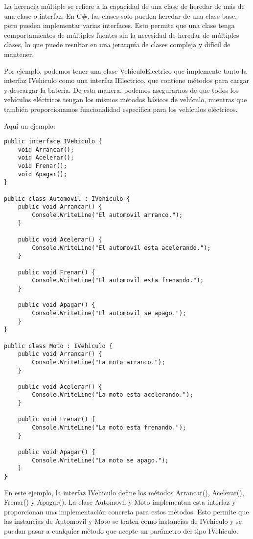 \documentclass[executivepaper]{article}
\begin{document}
La herencia múltiple se refiere a la capacidad de una clase de heredar de más de una clase o interfaz. En C\#, las clases solo pueden heredar de una clase base, pero pueden implementar varias interfaces. Esto permite que una clase tenga comportamientos de múltiples fuentes sin la necesidad de heredar de múltiples clases, lo que puede resultar en una jerarquía de clases compleja y difícil de mantener.

Por ejemplo, podemos tener una clase VehiculoElectrico que implemente tanto la interfaz IVehiculo como una interfaz IElectrico, que contiene métodos para cargar y descargar la batería. De esta manera, podemos asegurarnos de que todos los vehículos eléctricos tengan los mismos métodos básicos de vehículo, mientras que también proporcionamos funcionalidad específica para los vehículos eléctricos.

Aquí un ejemplo:
\begin{lstlisting}
public interface IVehiculo {
    void Arrancar();
    void Acelerar();
    void Frenar();
    void Apagar();
}

public class Automovil : IVehiculo {
    public void Arrancar() {
        Console.WriteLine("El automovil arranco.");
    }

    public void Acelerar() {
        Console.WriteLine("El automovil esta acelerando.");
    }

    public void Frenar() {
        Console.WriteLine("El automovil esta frenando.");
    }

    public void Apagar() {
        Console.WriteLine("El automovil se apago.");
    }
}

public class Moto : IVehiculo {
    public void Arrancar() {
        Console.WriteLine("La moto arranco.");
    }

    public void Acelerar() {
        Console.WriteLine("La moto esta acelerando.");
    }

    public void Frenar() {
        Console.WriteLine("La moto esta frenando.");
    }

    public void Apagar() {
        Console.WriteLine("La moto se apago.");
    }
}
\end{lstlisting}

En este ejemplo, la interfaz IVehiculo define los métodos Arrancar(), Acelerar(), Frenar() y Apagar(). La clase Automovil y Moto implementan esta interfaz y proporcionan una implementación concreta para estos métodos. Esto permite que las instancias de Automovil y Moto se traten como instancias de IVehiculo y se puedan pasar a cualquier método que acepte un parámetro del tipo IVehiculo.
\end{document}
